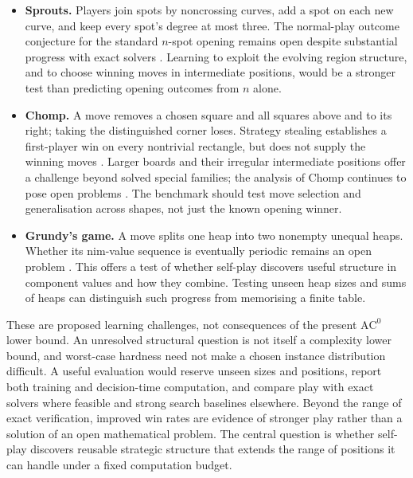 \documentclass[twoside,11pt]{article}
\newcommand{\AC}{\mathrm{AC}}
\numberwithin{theorem}{section}
\numberwithin{equation}{section}
\begin{document}
\begin{itemize}[leftmargin=*]
\item \textbf{Sprouts.} Players join spots by noncrossing curves, add a spot on each new curve, and keep every spot's degree at most three. The normal-play outcome conjecture for the standard $n$-spot opening remains open despite substantial progress with exact solvers \citep{cizek2026sprouts}. Learning to exploit the evolving region structure, and to choose winning moves in intermediate positions, would be a stronger test than predicting opening outcomes from $n$ alone.
\item \textbf{Chomp.} A move removes a chosen square and all squares above and to its right; taking the distinguished corner loses. Strategy stealing establishes a first-player win on every nontrivial rectangle, but does not supply the winning moves \citep{berlekamp2001winningways}. Larger boards and their irregular intermediate positions offer a challenge beyond solved special families; the analysis of Chomp continues to pose open problems \citep{nowakowski2025unsolved}. The benchmark should test move selection and generalisation across shapes, not just the known opening winner.
\item \textbf{Grundy's game.} A move splits one heap into two nonempty unequal heaps. Whether its nim-value sequence is eventually periodic remains an open problem \citep{nowakowski2025unsolved}. This offers a test of whether self-play discovers useful structure in component values and how they combine. Testing unseen heap sizes and sums of heaps can distinguish such progress from memorising a finite table.
\end{itemize}

These are proposed learning challenges, not consequences of the present $\AC^0$ lower bound. An unresolved structural question is not itself a complexity lower bound, and worst-case hardness need not make a chosen instance distribution difficult. A useful evaluation would reserve unseen sizes and positions, report both training and decision-time computation, and compare play with exact solvers where feasible and strong search baselines elsewhere. Beyond the range of exact verification, improved win rates are evidence of stronger play rather than a solution of an open mathematical problem. The central question is whether self-play discovers reusable strategic structure that extends the range of positions it can handle under a fixed computation budget.
\end{document}
